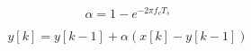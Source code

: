 \documentclass{article}
\begin{document}
\[\alpha = 1 - e^{-2\pi f_c T_s}
\]
\pagebreak

\[y[k] = y[k-1] + \alpha (x[k] - y[k-1])
\]
\pagebreak
\end{document}
